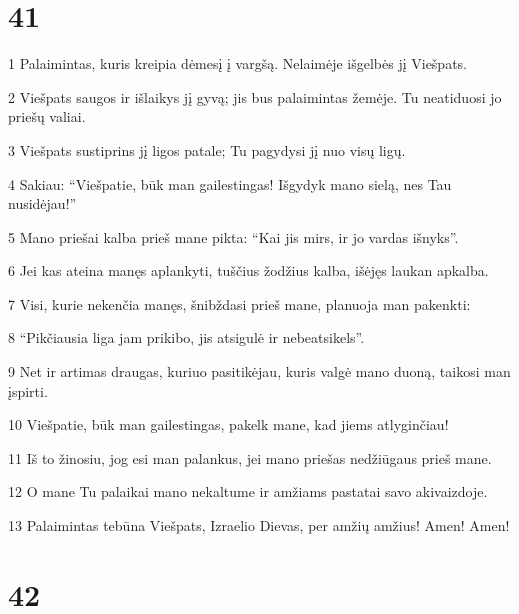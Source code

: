 \chapter{41}


\par 1 Palaimintas, kuris kreipia dėmesį į vargšą. Nelaimėje išgelbės jį Viešpats. 
\par 2 Viešpats saugos ir išlaikys jį gyvą; jis bus palaimintas žemėje. Tu neatiduosi jo priešų valiai. 
\par 3 Viešpats sustiprins jį ligos patale; Tu pagydysi jį nuo visų ligų. 
\par 4 Sakiau: “Viešpatie, būk man gailestingas! Išgydyk mano sielą, nes Tau nusidėjau!” 
\par 5 Mano priešai kalba prieš mane pikta: “Kai jis mirs, ir jo vardas išnyks”. 
\par 6 Jei kas ateina manęs aplankyti, tuščius žodžius kalba, išėjęs laukan apkalba. 
\par 7 Visi, kurie nekenčia manęs, šnibždasi prieš mane, planuoja man pakenkti: 
\par 8 “Pikčiausia liga jam prikibo, jis atsigulė ir nebeatsikels”. 
\par 9 Net ir artimas draugas, kuriuo pasitikėjau, kuris valgė mano duoną, taikosi man įspirti. 
\par 10 Viešpatie, būk man gailestingas, pakelk mane, kad jiems atlyginčiau! 
\par 11 Iš to žinosiu, jog esi man palankus, jei mano priešas nedžiūgaus prieš mane. 
\par 12 O mane Tu palaikai mano nekaltume ir amžiams pastatai savo akivaizdoje. 
\par 13 Palaimintas tebūna Viešpats, Izraelio Dievas, per amžių amžius! Amen! Amen!



\chapter{42}


